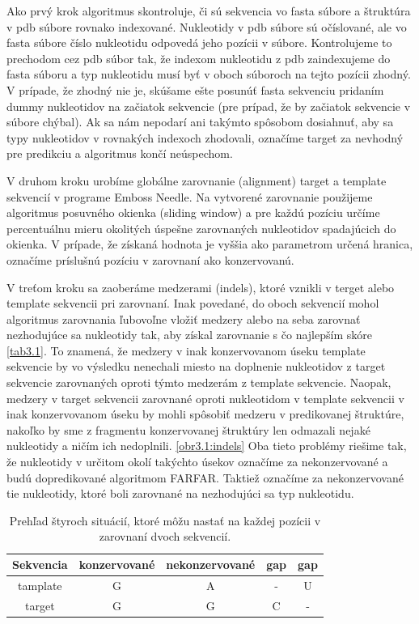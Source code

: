 \indent  Ako prvý krok algoritmus skontroluje, či sú sekvencia vo fasta súbore a štruktúra v pdb súbore rovnako indexované. Nukleotidy v pdb súbore sú očíslované, ale vo fasta súbore číslo nukleotidu odpovedá jeho pozícii v súbore. Kontrolujeme to prechodom cez pdb súbor tak, že indexom nukleotidu z pdb zaindexujeme do fasta súboru a typ nukleotidu musí byť v oboch súboroch na tejto pozícii zhodný. V prípade, že zhodný nie je, skúšame ešte posunúť fasta sekvenciu pridaním dummy nukleotidov na začiatok sekvencie (pre prípad, že by začiatok sekvencie v súbore chýbal). Ak sa nám nepodarí ani takýmto spôsobom dosiahnuť, aby sa typy nukleotidov v rovnakých indexoch zhodovali, označíme target za nevhodný pre predikciu a algoritmus končí neúspechom.


\indent V druhom kroku urobíme globálne zarovnanie (alignment) target a template sekvencií v programe Emboss Needle. Na vytvorené zarovnanie použijeme algoritmus posuvného okienka (sliding window) a pre každú pozíciu určíme percentuálnu mieru okolitých úspešne zarovnaných nukleotidov spadajúcich do okienka. V prípade, že získaná hodnota je vyššia ako parametrom určená hranica, označíme príslušnú pozíciu v zarovnaní ako konzervovanú. 


\indent V treťom kroku sa zaoberáme medzerami (indels), ktoré vznikli v terget alebo template sekvencii pri zarovnaní. Inak povedané, do oboch sekvencií mohol algoritmus zarovnania ľubovoľne vložiť medzery alebo na seba zarovnať nezhodujúce sa nukleotidy tak, aby získal zarovnanie s čo najlepším skóre \autoref{tab3.1}. 
To znamená, že medzery v inak konzervovanom úseku template sekvencie by vo výsledku nenechali miesto na doplnenie nukleotidov z target sekvencie zarovnaných oproti týmto medzerám z template sekvencie. 
Naopak, medzery v target sekvencii zarovnané oproti nukleotidom v template sekvencii v inak konzervovanom úseku by mohli spôsobiť medzeru v predikovanej štruktúre, nakoľko by sme z fragmentu konzervovanej štruktúry len odmazali nejaké nukleotidy a ničím ich nedoplnili. \autoref{obr3.1:indels}
Oba tieto problémy riešime tak, že nukleotidy v určitom okolí takýchto úsekov označíme za nekonzervované a budú dopredikované algoritmom FARFAR.
Taktiež označíme za nekonzervované tie nukleotidy, ktoré boli zarovnané na nezhodujúci sa typ nukleotidu. 

\begin{table}[b!]
\centering
\begin{tabular}{ccccc}
\toprule
Sekvencia  & konzervované  & nekonzervované & gap & gap \\
\midrule
tamplate  & G  & A & - & U \\
target  & G  & G & C & - \\
\bottomrule
\end{tabular}
\caption{Prehľad štyroch situácií, ktoré môžu nastať na každej pozícii v zarovnaní dvoch sekvencií.}\label{tab3.1}
\end{table}

